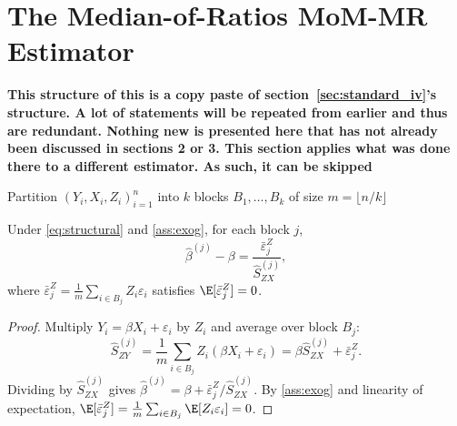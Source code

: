 \section{The Median-of-Ratios MoM-MR Estimator}
\textbf{This structure of this is a copy paste of section~\ref{sec:standard_iv}'s structure. A lot of statements will be repeated from earlier and thus are redundant. Nothing new is presented here that has not already been discussed in sections 2 or 3. This section applies what was done there to a different estimator. As such, it can be skipped}

\label{sec:mor}

\begin{algorithm}[H]
\label{alg:mor}
\caption{Median-of-Ratios Estimator}

Partition $(Y_i,X_i,Z_i)_{i=1}^{n}$ into $k$ blocks $B_1, \dots, B_k$ of size $m = \lfloor n/k \rfloor$\;


\;
\end{algorithm}

\begin{lemma}
\label{lem:mor_decomp}
Under \eqref{eq:structural} and \ref{ass:exog}, for each block $j$,
\begin{equation}
\label{eq:block_error}
    \hat{\beta}^{(j)} - \beta = \frac{\bar{\varepsilon}_j^Z}{\hat{S}_{ZX}^{(j)}},
\end{equation}
where $\bar{\varepsilon}_j^Z = \frac{1}{m}\sum_{i \in B_j}Z_i\varepsilon_i$ satisfies $\E[\bar{\varepsilon}_j^Z] = 0$.
\end{lemma}

\begin{proof}
Multiply $Y_i = \beta X_i + \varepsilon_i$ by $Z_i$ and average over block $B_j$:
\[
    \hat{S}_{ZY}^{(j)} = \frac{1}{m}\sum_{i \in B_j}Z_i(\beta X_i + \varepsilon_i) = \beta\hat{S}_{ZX}^{(j)} + \bar{\varepsilon}_j^Z.
\]
Dividing by $\hat{S}_{ZX}^{(j)}$ gives $\hat{\beta}^{(j)} = \beta + \bar{\varepsilon}_j^Z/\hat{S}_{ZX}^{(j)}$. By \ref{ass:exog} and linearity of expectation, $\E[\bar{\varepsilon}_j^Z] = \frac{1}{m}\sum_{i \in B_j}\E[Z_i\varepsilon_i] = 0$.
\end{proof}

